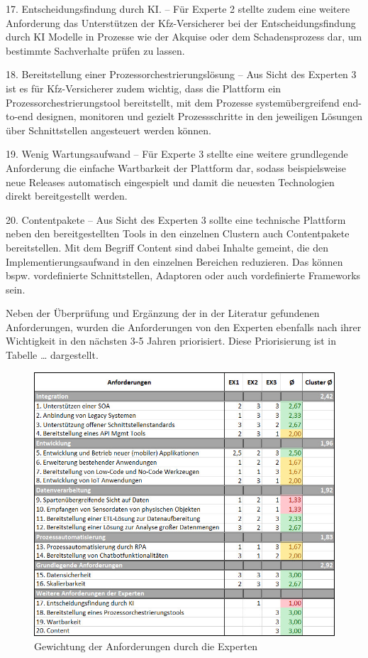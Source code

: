 17. Entscheidungsfindung durch KI. – Für Experte 2 stellte zudem eine weitere Anforderung das Unterstützen der Kfz-Versicherer bei der Entscheidungsfindung durch KI Modelle in Prozesse wie der Akquise oder dem Schadensprozess dar, um bestimmte Sachverhalte prüfen zu lassen.

18. Bereitstellung einer Prozessorchestrierungslösung – Aus Sicht des Experten 3 ist es für Kfz-Versicherer zudem wichtig, dass die Plattform ein Prozessorchestrierungstool bereitstellt, mit dem Prozesse systemübergreifend end-to-end designen, monitoren und gezielt Prozessschritte in den jeweiligen Lösungen über Schnittstellen angesteuert werden können. 

19. Wenig Wartungsaufwand – Für Experte 3 stellte eine weitere grundlegende Anforderung die einfache Wartbarkeit der Plattform dar, sodass beispielsweise neue Releases automatisch eingespielt und damit die neuesten Technologien direkt bereitgestellt werden.

20. Contentpakete – Aus Sicht des Experten 3 sollte eine technische Plattform neben den bereitgestellten Tools in den einzelnen Clustern auch Contentpakete bereitstellen. Mit dem Begriff Content sind dabei Inhalte gemeint, die den Implementierungsaufwand in den einzelnen Bereichen reduzieren. Das können bspw. vordefinierte Schnittstellen, Adaptoren oder auch vordefinierte Frameworks sein. 

Neben der Überprüfung und Ergänzung der in der Literatur gefundenen Anforderungen, wurden die Anforderungen von den Experten ebenfalls nach ihrer Wichtigkeit in den nächsten 3-5 Jahren priorisiert. Diese Priorisierung ist in Tabelle  … dargestellt.

\begin{figure}[h]
    \centering
    \includegraphics[width=1\textwidth]{img/Gewichtung_Anforderung.jpg}
    \caption[Gewichtung der Anforderungen durch die Experten]{Gewichtung der Anforderungen durch die Experten\autocite{Gewichtung}}
    \label{fig:Gewichtung}
\end{figure}

